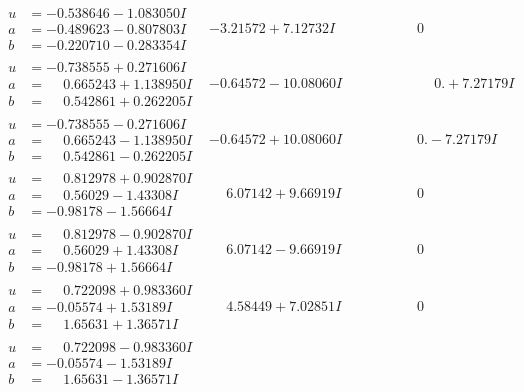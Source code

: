 \documentclass[1p]{elsarticle_modified}
\theoremstyle{definition}
\begin{document}
$$\begin{array}{c|c|c}
\begin{aligned}
u &= -0.538646 - 1.083050 I \\
a &= -0.489623 - 0.807803 I \\
b &= -0.220710 - 0.283354 I\end{aligned}
 & -3.21572 + 7.12732 I & \phantom{-0.000000 } 0 \\ \hline\begin{aligned}
u &= -0.738555 + 0.271606 I \\
a &= \phantom{-}0.665243 + 1.138950 I \\
b &= \phantom{-}0.542861 + 0.262205 I\end{aligned}
 & -0.64572 - 10.08060 I & \phantom{-0.000000 -}0. + 7.27179 I \\ \hline\begin{aligned}
u &= -0.738555 - 0.271606 I \\
a &= \phantom{-}0.665243 - 1.138950 I \\
b &= \phantom{-}0.542861 - 0.262205 I\end{aligned}
 & -0.64572 + 10.08060 I & \phantom{-0.000000 } 0. - 7.27179 I \\ \hline\begin{aligned}
u &= \phantom{-}0.812978 + 0.902870 I \\
a &= \phantom{-}0.56029 - 1.43308 I \\
b &= -0.98178 - 1.56664 I\end{aligned}
 & \phantom{-}6.07142 + 9.66919 I & \phantom{-0.000000 } 0 \\ \hline\begin{aligned}
u &= \phantom{-}0.812978 - 0.902870 I \\
a &= \phantom{-}0.56029 + 1.43308 I \\
b &= -0.98178 + 1.56664 I\end{aligned}
 & \phantom{-}6.07142 - 9.66919 I & \phantom{-0.000000 } 0 \\ \hline\begin{aligned}
u &= \phantom{-}0.722098 + 0.983360 I \\
a &= -0.05574 + 1.53189 I \\
b &= \phantom{-}1.65631 + 1.36571 I\end{aligned}
 & \phantom{-}4.58449 + 7.02851 I & \phantom{-0.000000 } 0 \\ \hline\begin{aligned}
u &= \phantom{-}0.722098 - 0.983360 I \\
a &= -0.05574 - 1.53189 I \\
b &= \phantom{-}1.65631 - 1.36571 I\end{aligned}

\end{array}$$
\end{document}
